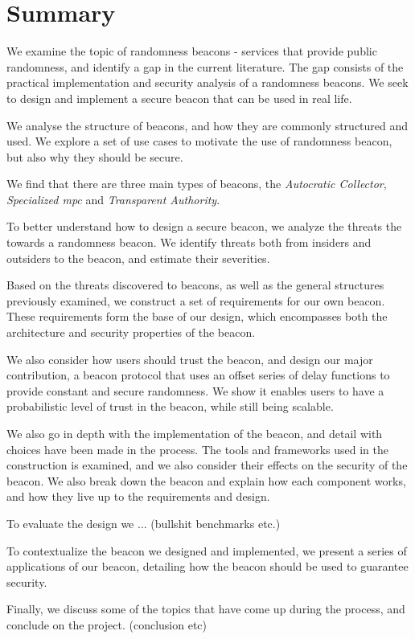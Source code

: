 \section*{Summary}
We examine the topic of randomness beacons - services that provide public randomness, and identify a gap in the current literature. The gap consists of the practical implementation and security analysis of a randomness beacons. We seek to design and implement a secure beacon that can be used in real life.

We analyse the structure of beacons, and how they are commonly structured and used. We explore a set of use cases to motivate the use of randomness beacon, but also why they should be secure.

We find that there are three main types of beacons, the \emph{Autocratic Collector}, \emph{Specialized \acrshort{mpc}} and \emph{Transparent Authority}.

To better understand how to design a secure beacon, we analyze the threats the towards a randomness beacon. We identify threats both from insiders and outsiders to the beacon, and estimate their severities.

Based on the threats discovered to beacons, as well as the general structures previously examined, we construct a set of requirements for our own beacon. These requirements form the base of our design, which encompasses both the architecture and security properties of the beacon.

We also consider how users should trust the beacon, and design our major contribution, a beacon protocol that uses an offset series of delay functions to provide constant and secure randomness. We show it enables users to have a probabilistic level of trust in the beacon, while still being scalable.

We also go in depth with the implementation of the beacon, and detail with choices have been made in the process. The tools and frameworks used in the construction is examined, and we also consider their effects on the security of the beacon. We also break down the beacon and explain how each component works, and how they live up to the requirements and design.

To evaluate the design we ... (bullshit benchmarks etc.)

To contextualize the beacon we designed and implemented, we present a series of applications of our beacon, detailing how the beacon should be used to guarantee security.

Finally, we discuss some of the topics that have come up during the process, and conclude on the project. (conclusion etc)
